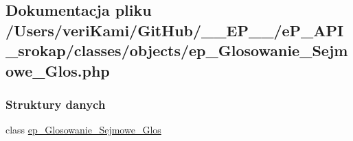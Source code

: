 \hypertarget{ep___glosowanie___sejmowe___glos_8php}{\subsection{Dokumentacja pliku /\-Users/veri\-Kami/\-Git\-Hub/\-\_\-\-\_\-\-E\-P\-\_\-\-\_\-/e\-P\-\_\-\-A\-P\-I\-\_\-srokap/classes/objects/ep\-\_\-\-Glosowanie\-\_\-\-Sejmowe\-\_\-\-Glos.php}
\label{ep___glosowanie___sejmowe___glos_8php}
}
\subsubsection*{Struktury danych}
\begin{DoxyCompactItemize}
\item 
class \hyperlink{classep___glosowanie___sejmowe___glos}{ep\-\_\-\-Glosowanie\-\_\-\-Sejmowe\-\_\-\-Glos}
\end{DoxyCompactItemize}
